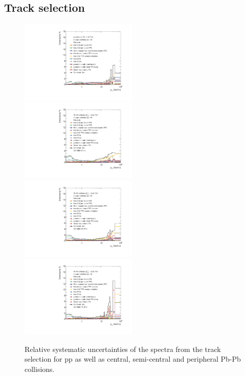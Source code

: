\documentclass[12pt,a4paper]{report}
\begin{document}
\subsection{Track selection} 
\label{systracksel}
\begin{figure}[!htb]
\centering
\includegraphics[width=0.495\textwidth]{Plots/SysUncpp.pdf}  
\includegraphics[width=0.495\textwidth]{Plots/SysUncPbPbcent.pdf}  
\includegraphics[width=0.495\textwidth]{Plots/SysUncPbPbsemi.pdf}  
\includegraphics[width=0.495\textwidth]{Plots/SysUncPbPbperi.pdf}  
\caption{Relative systematic uncertainties of the \pt spectra from the track selection for pp as well as central, semi-central and peripheral Pb-Pb collisions.}
\label{SysUncSpec}
\end{figure}
\end{document}

